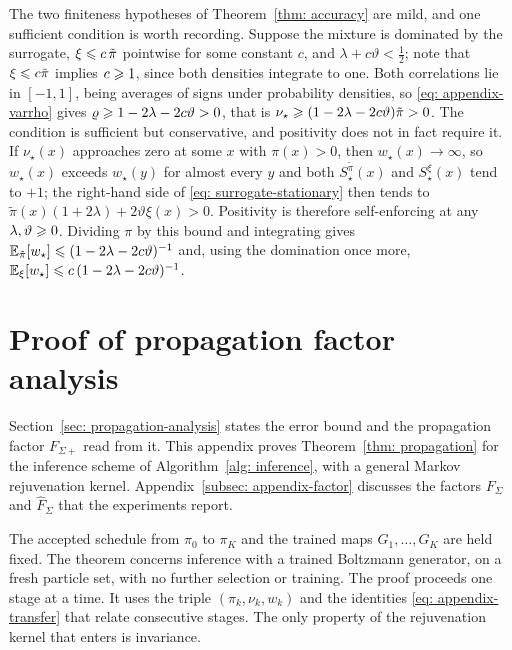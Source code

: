 \documentclass{article}
\begin{document}
\begin{remark}
\label{rem: appendix-domination}
The two finiteness hypotheses of Theorem~\ref{thm: accuracy} are mild, and one sufficient condition is worth recording. Suppose the mixture is dominated by the surrogate, $\xi\leqslant c\,\tilde\pi$ pointwise for some constant $c$, and $\lambda+c\vartheta<\tfrac12$; note that $\xi\leqslant c\tilde\pi$ implies $c\geqslant1$, since both densities integrate to one. Both correlations lie in $[-1,1]$, being averages of signs under probability densities, so \eqref{eq: appendix-varrho} gives $\varrho\geqslant1-2\lambda-2c\vartheta>0$, that is $\nu_\star\geqslant(1-2\lambda-2c\vartheta)\tilde\pi>0$. {\color{purple}The condition is sufficient but conservative, and positivity does not in fact require it. If $\nu_\star(x)$ approaches zero at some $x$ with $\pi(x)>0$, then $w_\star(x)\to\infty$, so $w_\star(x)$ exceeds $w_\star(y)$ for almost every $y$ and both $S^{\tilde\pi}_\star(x)$ and $S^{\xi}_\star(x)$ tend to $+1$; the right-hand side of \eqref{eq: surrogate-stationary} then tends to $\tilde\pi(x)(1+2\lambda)+2\vartheta\xi(x)>0$. Positivity is therefore self-enforcing at any $\lambda,\vartheta\geqslant0$.} Dividing $\pi$ by this bound and integrating gives $\mathbb E_{\tilde\pi}[w_\star]\leqslant(1-2\lambda-2c\vartheta)^{-1}$ and, using the domination once more, $\mathbb E_{\xi}[w_\star]\leqslant c\,(1-2\lambda-2c\vartheta)^{-1}$.
\end{remark}


\section{ Proof of propagation factor analysis}
\label{sec: appendix-propagation}

Section~\ref{sec: propagation-analysis} states the error bound and the propagation factor $F_{\Sigma+}$ read from it. This appendix proves Theorem~\ref{thm: propagation} for {\color{blue}the inference scheme of Algorithm~\ref{alg: inference}}, with a general Markov rejuvenation kernel. Appendix~\ref{subsec: appendix-factor} discusses the factors $F_{\Sigma}$ and $\hat F_{\Sigma}$ that the experiments report.

The accepted schedule from $\pi_0$ to $\pi_K$ and the trained maps $G_1,\dots,G_K$ are held fixed. The theorem concerns inference with a trained Boltzmann generator, on a fresh particle set, with no further selection or training. The proof proceeds one stage at a time. It uses the triple $(\pi_k,\nu_k,w_k)$ and the identities \eqref{eq: appendix-transfer} that relate consecutive stages. The only property of the rejuvenation kernel that enters is invariance.
\end{document}
